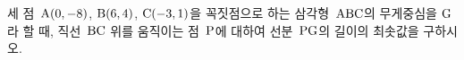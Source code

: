 세 점~$\mathrm{A}(0{,}\mkern3mu\mathopen{}-8)$, $\mathrm{B}(6{,}\mkern3mu\mathopen{}4)$, $\mathrm{C}(-3{,}\mkern3mu\mathopen{}1)$을 꼭짓점으로 하는 삼각형~$\mathrm{ABC}$의 무게중심을 $\mathrm{G}$라 할 때, 직선~$\mathrm{BC}$ 위를 움직이는 점~$\mathrm{P}$에 대하여 선분~$\mathrm{PG}$의 길이의 최솟값을 구하시오.
